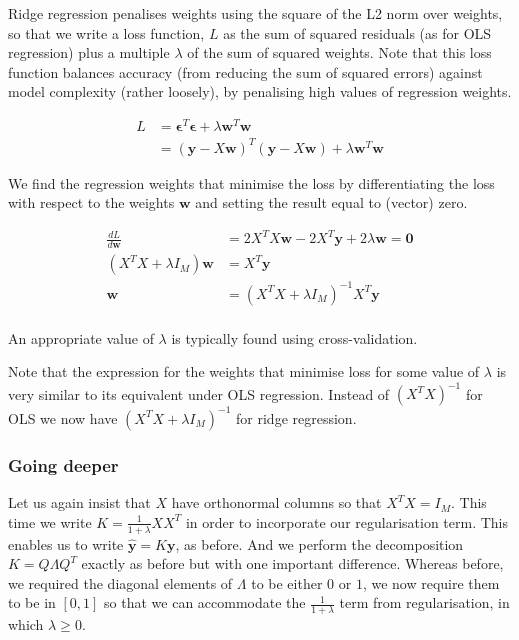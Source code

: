 \documentclass[11pt]{article}
\begin{document}
	Ridge regression penalises weights using the square of the L2 norm over weights, so that we write a loss function, $L$ as the sum of squared residuals (as for OLS regression) plus a multiple $\lambda$ of the sum of squared weights. Note that this loss function balances accuracy (from reducing the sum of squared errors) against model complexity (rather loosely), by penalising high values of regression weights.
	
	\begin{align*}
		L &= \boldsymbol{\epsilon}^{T}\boldsymbol{\epsilon} + \lambda \boldsymbol{w}^{T}\boldsymbol{w} \\
		&= (\boldsymbol{y} - X\boldsymbol{w})^{T}(\boldsymbol{y} - X\boldsymbol{w}) + \lambda \boldsymbol{w}^{T}\boldsymbol{w}
	\end{align*}
	
	We find the regression weights that minimise the loss by differentiating the loss with respect to the weights $\boldsymbol{w}$ and setting the result equal to (vector) zero.
	
	\begin{align*}
		\frac{dL}{d\boldsymbol{w}} &= 2X^{T}X \boldsymbol{w} - 2X^{T} \boldsymbol{y} + 2 \lambda \boldsymbol{w} = \boldsymbol{0} \\
		(X^{T}X + \lambda I_{M}) \boldsymbol{w} &= X^{T} \boldsymbol{y} \\
		\boldsymbol{w} &= (X^{T}X + \lambda I_{M})^{-1}X^{T} \boldsymbol{y} \\
	\end{align*}
	
	An appropriate value of $\lambda$ is typically found using cross-validation.
	
	Note that the expression for the weights that minimise loss for some value of $\lambda$ is very similar to its equivalent under OLS regression. Instead of $(X^{T}X)^{-1}$ for OLS we now have $(X^{T}X + \lambda I_{M})^{-1}$ for ridge regression.
	
	\subsubsection{Going deeper}
	
	Let us again insist that $X$ have orthonormal columns so that $X^{T}X = I_{M}$. This time we write $K = \frac{1}{1 + \lambda}XX^{T}$ in order to incorporate our regularisation term. This enables us to write $\boldsymbol{\hat{y}} = K\boldsymbol{y}$, as before. And we perform the decomposition $K = Q \Lambda Q^{T}$ exactly as before but with one important difference. Whereas before, we required the diagonal elements of $\Lambda$ to be either $0$ or $1$, we now require them to be in $[0, 1]$ so that we can accommodate the $\frac{1}{1 + \lambda}$ term from regularisation, in which $\lambda \geq 0$. 
	
\end{document}
